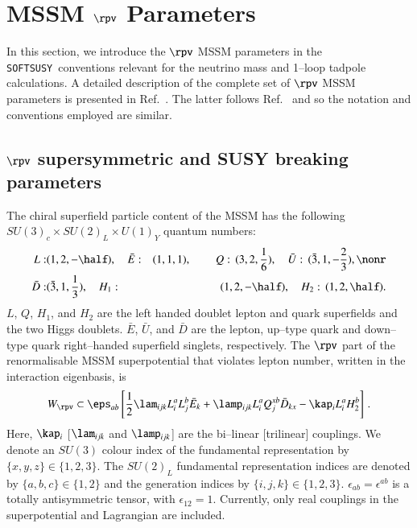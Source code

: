 \documentclass[pdflatex,final,3p,times]{elsarticle}
\def\SOFTSUSY{{\tt SOFTSUSY}}
\begin{document}
\section{MSSM $\rpv$ Parameters \label{sec:notation}}

In this section, we introduce the $\rpv$ MSSM parameters in the
\SOFTSUSY~conventions relevant for the neutrino mass and 1--loop
tadpole calculations.  A detailed description of the complete set of
$\rpv$ MSSM parameters is presented in Ref.~\cite{Allanach:2009bv}.
The latter follows Ref.~\cite{Allanach:2003eb} and so the notation and
conventions employed are similar. 

\subsection{$\rpv$ supersymmetric and SUSY breaking parameters \label{susypars}}

The chiral superfield particle content of the MSSM has the following
$SU(3)_c\times SU(2)_L\times U(1)_Y$ quantum numbers:
\begin{eqnarray}
L:&(1,2,-\half),\quad {\bar E}:&(1,1,1),\qquad\, Q:\,(3,2,\frac{1}{6}),\quad
{\bar U}:\,(\bar 3,1,-\frac{2}{3}),\nonr\\ {\bar D}:&(\bar 3,1,\frac{1}{3}),\quad
H_1:&(1,2,-\half),\quad  H_2:\,(1,2,\half).
\label{fields}
\end{eqnarray}
$L$, $Q$, $H_1$, and $H_2$ are the left handed doublet lepton and
quark superfields and the two Higgs doublets. $\bar E$, $\bar U$, and
$\bar D$ are the lepton, up--type quark and down--type quark
right--handed superfield singlets, respectively.  The $\rpv$ part of
the renormalisable MSSM superpotential that violates lepton number,
written in the interaction eigenbasis, is
\begin{equation} 
W_{\rpv}\subset\eps_{ab}\left[ \frac{1}{2} \lam_{ijk} L_i^a L_j^b{\bar E}_k
  + \lamp_{ijk} L_i^a Q_j^{xb} {\bar D}_{kx} - \kap_i L_i^a H_2^b
  \right]\,.
 \label{superpot1} 
\end{equation} 
Here, $\kap_i$ [$\lam_{ijk}$ and $\lamp_{ijk}$] are the bi--linear
[trilinear] couplings.  We denote an $SU(3)$ colour index of the
fundamental representation by $\{x,y,z\} \in \{1,2,3 \}$. The
$SU(2)_L$ fundamental representation indices are denoted by $\{a,b,c\}
\in \{1,2\}$ and the generation indices by $\{i,j,k\} \in \{1,2,3\}$.
$\epsilon_{ab}=\epsilon^{ab}$ is a totally antisymmetric tensor, with
$\epsilon_{12}=1$.  Currently, only real couplings in the
superpotential and Lagrangian are included.
\end{document}
